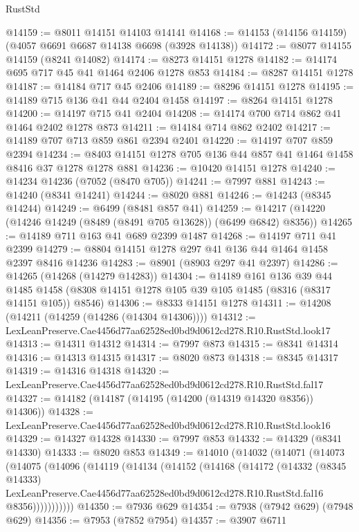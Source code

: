 \begin{lexlean}{RustStd}
\begin{coremodule}
@14159 := @8011 @14151 @14103 @14141
@14168 := @14153 (@14156 @14159) (@4057 @6691 @6687 @14138 @6698 (@3928 @14138))
@14172 := @8077 @14155 @14159 (@8241 @14082)
@14174 := @8273 @14151 @1278
@14182 := @14174 @695 @717 @45 @41 @1464 @2406 @1278 @853
@14184 := @8287 @14151 @1278
@14187 := @14184 @717 @45 @2406
@14189 := @8296 @14151 @1278
@14195 := @14189 @715 @136 @41 @44 @2404 @1458
@14197 := @8264 @14151 @1278
@14200 := @14197 @715 @41 @2404
@14208 := @14174 @700 @714 @862 @41 @1464 @2402 @1278 @873
@14211 := @14184 @714 @862 @2402
@14217 := @14189 @707 @713 @859 @861 @2394 @2401
@14220 := @14197 @707 @859 @2394
@14234 := @8403 @14151 @1278 @705 @136 @44 @857 @41 @1464 @1458 @8416 @37 @1278 @1278 @881
@14236 := @10420 @14151 @1278
@14240 := @14234 @14236 (@7052 (@8470 @705))
@14241 := @7997 @881
@14243 := @14240 (@8341 @14241)
@14244 := @8020 @881
@14246 := @14243 (@8345 @14244)
@14249 := @6499 (@8481 @857 @41)
@14259 := @14217 (@14220 (@14246 @14249 (@8489 (@8491 @705 @13628)) (@6499 @6842) @8356))
@14265 := @14189 @711 @163 @41 @689 @2399 @1487
@14268 := @14197 @711 @41 @2399
@14279 := @8804 @14151 @1278 @297 @41 @136 @44 @1464 @1458 @2397 @8416 @14236
@14283 := @8901 (@8903 @297 @41 @2397)
@14286 := @14265 (@14268 (@14279 @14283))
@14304 := @14189
    @161
    @136
    @39
    @44
    @1485
    @1458
    (@8308 @14151 @1278 @105 @39 @105 @1485 (@8316 (@8317 @14151 @105)) @8546)
@14306 := @8333 @14151 @1278
@14311 := @14208 (@14211 (@14259 (@14286 (@14304 @14306))))
@14312 := LexLeanPreserve.Cae4456d77aa62528ed0bd9d0612cd278.R10.RustStd.look17
@14313 := @14311 @14312
@14314 := @7997 @873
@14315 := @8341 @14314
@14316 := @14313 @14315
@14317 := @8020 @873
@14318 := @8345 @14317
@14319 := @14316 @14318
@14320 := LexLeanPreserve.Cae4456d77aa62528ed0bd9d0612cd278.R10.RustStd.fal17
@14327 := @14182 (@14187 (@14195 (@14200 (@14319 @14320 @8356)) @14306))
@14328 := LexLeanPreserve.Cae4456d77aa62528ed0bd9d0612cd278.R10.RustStd.look16
@14329 := @14327 @14328
@14330 := @7997 @853
@14332 := @14329 (@8341 @14330)
@14333 := @8020 @853
@14349 := @14010
    (@14032
      (@14071
        (@14073
          (@14075
            (@14096
              (@14119
                (@14134
                  (@14152
                    (@14168
                      (@14172
                        (@14332
                          (@8345 @14333)
                          LexLeanPreserve.Cae4456d77aa62528ed0bd9d0612cd278.R10.RustStd.fal16
                          @8356)))))))))))
@14350 := @7936 @629
@14354 := @7938 (@7942 @629) (@7948 @629)
@14356 := @7953 (@7852 @7954)
@14357 := @3907 @6711

\end{coremodule}
\end{lexlean}
